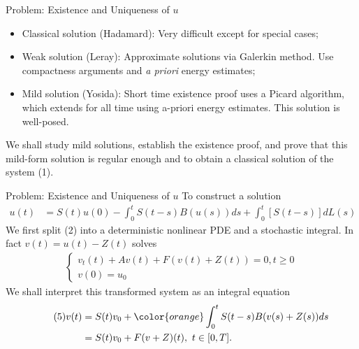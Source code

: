 \documentclass[xcolor=dvipsnames,leqno]{beamer}
\begin{document}
\begin{frame}{Problem: Existence and Uniqueness of $u$}
		\begin{itemize}
			\setlength{\itemsep}{20pt}
			\item Classical solution (Hadamard): Very difficult except for special cases;
			\item Weak solution (Leray): Approximate solutions via Galerkin method. Use compactness arguments and \emph{a priori} energy estimates;
			\item Mild solution (Yosida): Short time existence proof uses a Picard algorithm, which extends for all time using a-priori energy estimates. %
			This solution is well-posed.
		\end{itemize}
		\vspace{0.5cm}
	We shall study mild solutions, establish the existence proof, and prove that this mild-form solution is regular enough and to obtain a classical solution of the system (1).
\end{frame}       

\begin{frame}{Problem: Existence and Uniqueness of $u$}
To construct a solution  
\begin{align*}
	u(t)&=S(t)u(0)-\int_{0}^{t} S(t-s)B(u(s))ds+\int_{0}^{t}[S(t-s)]dL(s)
\end{align*}
We first split (2) into a deterministic nonlinear PDE and a stochastic integral. In fact $v(t)=u(t)-Z(t)$ solves
			\begin{align*}\tag{4}
				\begin{cases}					v_t(t)+Av(t)+F(v(t)+Z(t))=0, t\geq 0\\
					v(0)=u_0%
				\end{cases}	
			\end{align*}
We shall interpret this transformed system as an integral equation
\begin{align*}\tag{5}
	v(t)&=S(t)v_0+{\color{orange}\int_{0}^{t}S(t-s)B(v(s)+Z(s))ds}\\
	&=S(t)v_0+F(v+Z)(t),\,\,t\in[0,T].
\end{align*}
   

\end{frame} 
\end{document}
